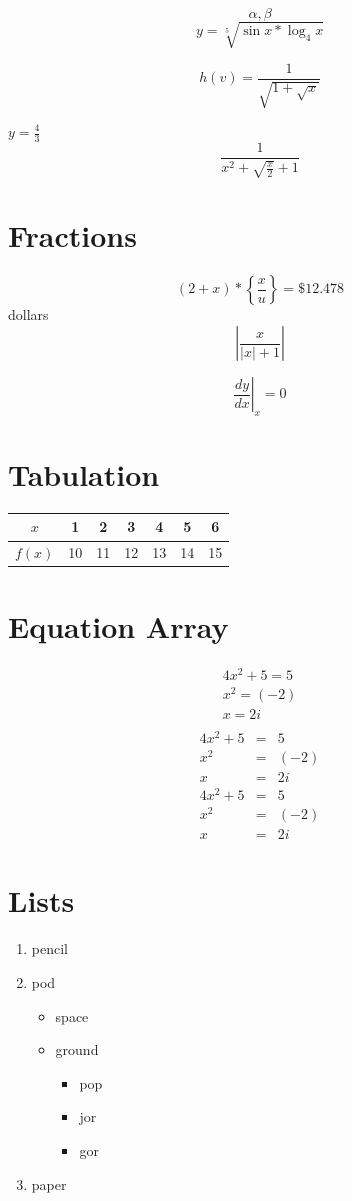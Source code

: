 \documentclass[11pt]{article}
\begin{document}
$$\alpha,\beta$$
$$ y= \sqrt[5]{\sin{x}*\log_4{x}} $$

$$ h(v)=\frac{1}{\sqrt{1+\sqrt{x}}} $$

$ y= \displaystyle{\frac{4}{3}}$     %
$$ \frac{1}{x^2+\sqrt{\frac{x}{2}}+1}$$


\section{Fractions}

$$ (2+x) * \left\{\frac{x}{u}\right\} =\$12.478$$ 
dollars \\
$$ \left|\frac{x}{|x|+1}\right|$$

$$\left. \frac{dy}{dx}\right|_x=0$$

\section{Tabulation}
\begin{tabular}{|c|c|c|c|c|c|c|}
\hline 
$x$ & 1 & 2 & 3 & 4 & 5 & 6 \\ \hline
$f(x)$ & 10 & 11 & 12 & 13 & 14 & 15  \\ \hline
\end{tabular}

\section{Equation Array}
\begin{eqnarray}
4x^2+5=5 \\
x^2=(-2) \\
x=2i \\
\end{eqnarray}
\begin{eqnarray}
 4x^2+5&=&5 \\
x^2&=&(-2)\\ 
x&=&2i
\end{eqnarray}
\begin{eqnarray*}
 4x^2+5&=&5 \\
x^2&=&(-2)\\ 
x&=&2i
\end{eqnarray*}

\section{Lists}
\begin{enumerate}
 \item pencil
 \item pod
    \begin{itemize}
     \item space
     \item ground
        \begin{itemize}
         \item pop
         \item jor
         \item gor
        \end{itemize}
    \end{itemize}
 \item paper
\end{enumerate}
 
\end{document}
